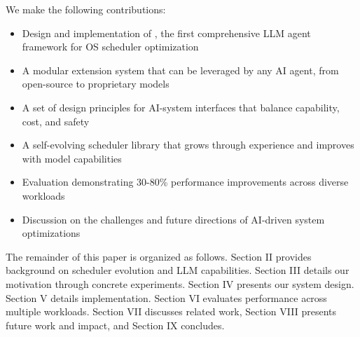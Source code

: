 We make the following contributions:
\begin{itemize}
\item Design and implementation of \sys, the first comprehensive LLM agent framework for OS scheduler optimization
\item A modular extension system that can be leveraged by any AI agent, from open-source to proprietary models
\item A set of design principles for AI-system interfaces that balance capability, cost, and safety
\item A self-evolving scheduler library that grows through experience and improves with model capabilities
\item Evaluation demonstrating 30-80\% performance improvements across diverse workloads
\item Discussion on the challenges and future directions of AI-driven system optimizations
\end{itemize}

The remainder of this paper is organized as follows. Section II provides background on scheduler evolution and LLM capabilities. Section III details our motivation through concrete experiments. Section IV presents our system design. Section V details implementation. Section VI evaluates performance across multiple workloads. Section VII discusses related work, Section VIII presents future work and impact, and Section IX concludes.